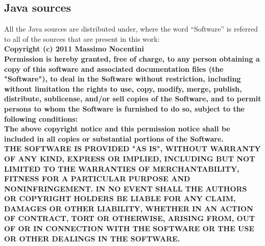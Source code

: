\subsection*{Java sources}
All the Java sources are distributed under, where the word ``Software'' is
referred to all of the sources that are present in this work: \\
\textbf{
Copyright (c) 2011 Massimo Nocentini\\
Permission is hereby granted, free of charge, to any person obtaining a copy of
this software and associated documentation files (the "Software"), to deal in 
the Software without restriction, including without limitation the rights to 
use, copy, modify, merge, publish, distribute, sublicense, and/or sell 
copies of the Software, and to permit persons to whom the Software is furnished 
to do so, subject to the following conditions:\\
The above copyright notice and this permission notice shall be included in all 
copies or substantial portions of the Software.\\
THE SOFTWARE IS PROVIDED "AS IS", WITHOUT WARRANTY OF ANY KIND, EXPRESS OR 
IMPLIED, INCLUDING BUT NOT LIMITED TO THE WARRANTIES OF MERCHANTABILITY, 
FITNESS FOR A PARTICULAR PURPOSE AND NONINFRINGEMENT. IN NO EVENT SHALL THE 
AUTHORS OR COPYRIGHT HOLDERS BE LIABLE FOR ANY CLAIM, DAMAGES OR OTHER LIABILITY, 
WHETHER IN AN ACTION OF CONTRACT, TORT OR OTHERWISE, ARISING FROM, OUT OF OR IN 
CONNECTION WITH THE SOFTWARE OR THE USE OR OTHER DEALINGS IN THE SOFTWARE.
}
